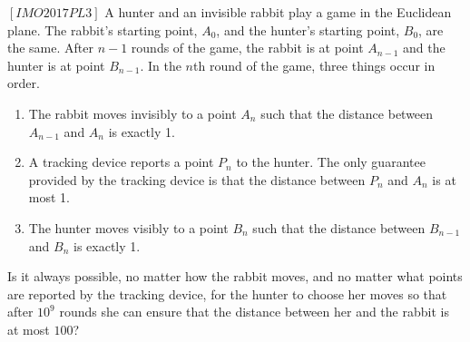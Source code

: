 \begin{problem}
$[IMO2017PL3]$
A hunter and an invisible rabbit play a game in the Euclidean plane. The rabbit's starting point, $A_0$, and the hunter's starting point, $B_0$, are the same. After $n-1$ rounds of the game, the rabbit is at point $A_{n-1}$ and the hunter is at point $B_{n-1}$. In the $n$th round of the game, three things occur in order.
\begin{enumerate}
\item The rabbit moves invisibly to a point $A_n$ such that the distance between $A_{n-1}$ and $A_n$ is exactly 1.
\item A tracking device reports a point $P_n$ to the hunter. The only guarantee provided by the tracking device is that the distance between $P_n$ and $A_n$ is at most 1.
\item The hunter moves visibly to a point $B_n$ such that the distance between $B_{n-1}$ and $B_n$ is exactly 1.
\end{enumerate}
Is it always possible, no matter how the rabbit moves, and no matter what points are reported by the tracking device, for the hunter to choose her moves so that after $10^9$ rounds she can ensure that the distance between her and the rabbit is at most $100$?

\end{problem}

